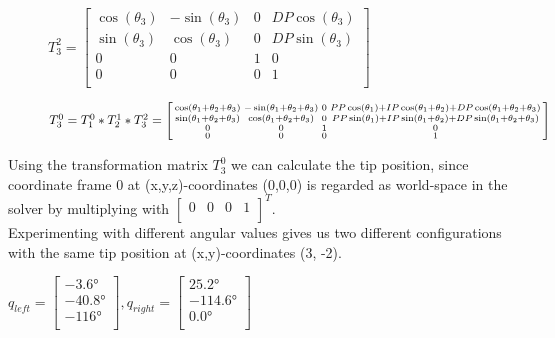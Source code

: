 \documentclass{article}
\begin{document}
\begin{figure}[h!]
\centering
\(T_3^2 = \begin{bmatrix}
       		\cos(\theta_3) & -\sin(\theta_3) & 0 & DP\cos(\theta_3) \\[0.3em]
       		\sin(\theta_3) & \cos(\theta_3) & 0 & DP\sin(\theta_3) \\[0.3em]
       		0 & 0 & 1 & 0 \\[0.3em]
       		0 & 0 & 0 & 1 \\[0.3em]
     \end{bmatrix}\)
\end{figure}

\begin{figure}[h!]
\centering
\(T_3^0 = T_1^0 * T_2^1 * T_3^2 = \begin{bsmallmatrix}
       		\cos(\theta_1+\theta_2+\theta_3) & -\sin(\theta_1+\theta_2+\theta_3) & 0 & PP\cos(\theta_1) + IP\cos(\theta_1 + \theta_2) + DP\cos(\theta_1 + \theta_2 +\theta_3) \\
       		\sin(\theta_1+\theta_2+\theta_3) & \cos(\theta_1+\theta_2+\theta_3) & 0 & PP\sin(\theta_1) + IP\sin(\theta_1 + \theta_2) + DP\sin(\theta_1 + \theta_2 +\theta_3) \\
       		0 & 0 & 1 & 0 \\
       		0 & 0 & 0 & 1 \\
     \end{bsmallmatrix}\)
\end{figure}

Using the transformation matrix \(T_3^0\) we can calculate the tip position, since coordinate frame 0 at (x,y,z)-coordinates (0,0,0) is regarded as world-space in the solver by multiplying with \(\begin{bmatrix}0&0&0&1\\\end{bmatrix}^T\).\\

Experimenting with different angular values gives us two different configurations with the same tip position at (x,y)-coordinates (3, -2).

\(q_{left} = \begin{bmatrix}-3.6\si{\degree}\\-40.8\si{\degree}\\-116\si{\degree}\\\end{bmatrix}, q_{right} = \begin{bmatrix}25.2\si{\degree}\\-114.6\si{\degree}\\0.0\si{\degree}\\\end{bmatrix}\)
\end{document}
